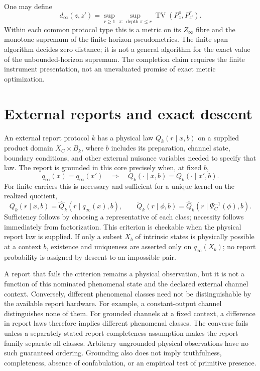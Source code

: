 One may define
\[
 d_\infty(z,z')=\sup_{r\geq1}\sup_{\pi:\,\operatorname{depth}\pi\leq r}
     \operatorname{TV}(P_z^\pi,P_{z'}^\pi).
\]
Within each common protocol type this is a metric on its $Z_\infty$ fibre and the monotone supremum of the
finite-horizon pseudometrics. The finite span algorithm decides zero
distance; it is not a general algorithm for the exact value of the
unbounded-horizon supremum. The completion claim requires the finite
instrument presentation, not an unevaluated promise of exact metric
optimization.

\section{External reports and exact descent}
\label{sec:spc2-grounded-reports}
An external report protocol $k$ has a physical law $Q_k(r\mid x,b)$
on a supplied product domain $X_C\times B_k$, where $b$ includes its preparation, channel state, boundary conditions,
and other external nuisance variables needed to specify that law.
The report is grounded in this core precisely when, at fixed $b$,
\[
 q_\infty(x)=q_\infty(x')\quad\Longrightarrow\quad
 Q_k(\cdot\mid x,b)=Q_k(\cdot\mid x',b).
\]
For finite carriers this is necessary and sufficient for a unique
kernel on the realized quotient,
\[
 Q_k(r\mid x,b)=\widehat Q_k(r\mid q_\infty(x),b),\qquad
 \widetilde Q_k(r\mid\phi,b)
 =\widehat Q_k(r\mid\Psi_C^{-1}(\phi),b).
\]
Sufficiency follows by choosing a representative of each class;
necessity follows immediately from factorization. This criterion is
checkable when the physical report law is supplied. If only a subset $X_b$ of intrinsic states is physically possible at a context $b$, existence and uniqueness are asserted only on $q_\infty(X_b)$; no report probability is assigned by descent to an impossible pair.

A report that fails the criterion remains a physical observation,
but it is not a function of this nominated phenomenal state and the
declared external channel context. Conversely, different phenomenal
classes need not be distinguishable by the available report hardware.
For example, a constant-output channel distinguishes none of them.
For grounded channels at a fixed context, a difference in report laws therefore implies different phenomenal classes. The converse fails unless a separately stated report-completeness assumption makes the report family separate all classes. Arbitrary ungrounded physical observations have no such guaranteed ordering. Grounding also does not imply truthfulness, completeness,
absence of confabulation, or an empirical test of primitive presence.

